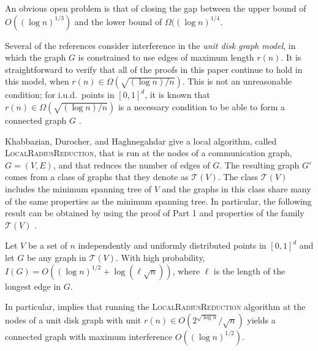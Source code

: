 \documentclass{patmorin}
\newcommand{\mst}{\mathit{MST}}
\begin{document}
An obvious open problem is that of closing the gap between the upper bound
of $O((\log n)^{1/3})$ and the lower bound of $\Omega((\log n)^{1/4}$.


Several of the references consider interference in the \emph{unit
disk graph model}, in which the graph $G$ is constrained to use
edges of maximum length $r(n)$.  It is straightforward to verify
that all of the proofs in this paper continue to hold in this model,
when $r(n)\in\Omega(\sqrt{(\log n)/n})$.  This is not an unreasonable
condition; for i.u.d.\ points in $[0,1]^d$, it is known that
$r(n)\in\Omega(\sqrt{(\log n)/n})$ is a necessary condition to be able to
form a connected graph $G$ \cite{p97}.

Khabbazian, Durocher, and Haghnegahdar \cite{kdhk15} give a local
algorithm, called \textsc{LocalRadiusReduction}, that is run at the
nodes of a communication graph, $G=(V,E)$, and that reduces the number
of edges of $G$.  The resulting graph $G'$ comes from a class of graphs
that they denote as $\mathcal{T}(V)$.  The class $\mathcal{T}(V)$ includes
the minimum spanning tree of $V$ and the graphs in this class share many
of the same properties as the minimum spanning tree.  In particular, the
following result can be obtained by using the proof of  Part
1 and properties of the family $\mathcal{T}(V)$ \cite[Theorem~3]{kdhk15}.

\setcounter{thm}{2}
\begin{thm}
  Let $V$ be a set of $n$ independently and uniformly distributed
  points in $[0,1]^d$ and let $G$ be any graph in $\mathcal{T}(V)$.
  With high probability, $I(G)=O((\log n)^{1/2}+\log (\ell\sqrt{n}))$,
  where $\ell$ is the length of the longest edge in $G$.
\end{thm}

In particular,  implies that running the
\textsc{LocalRadiusReduction} algorithm at the nodes of a unit disk graph
with unit $r(n)\in O(2^{\sqrt{\log n}}/\sqrt{n})$ yields a connected
graph with maximum interference $O((\log n)^{1/2})$.
\end{document}
